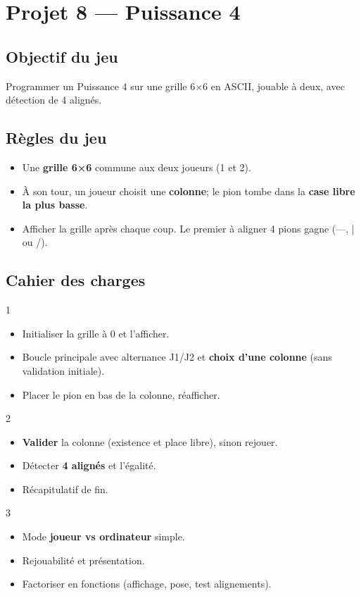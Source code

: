 \section{Projet 8 — Puissance 4}
\setcounter{UPSTInumeroCahier des charges}{0}

\subsection*{Objectif du jeu}
Programmer un Puissance 4 sur une grille 6×6 en ASCII, jouable à deux, avec détection de 4 alignés.

\subsection*{Règles du jeu}
\begin{itemize}
  \item Une \textbf{grille 6×6} commune aux deux joueurs (1 et 2).
  \item À son tour, un joueur choisit une \textbf{colonne}; le pion tombe dans la \textbf{case libre la plus basse}.
  \item Afficher la grille après chaque coup. Le premier à aligner 4 pions gagne (—, | ou /).
\end{itemize}

\subsection*{Cahier des charges}
\begin{UPSTICahierDesCharges}{1}
\begin{itemize}
  \item Initialiser la grille à 0 et l’afficher.
  \item Boucle principale avec alternance J1/J2 et \textbf{choix d’une colonne} (sans validation initiale).
  \item Placer le pion en bas de la colonne, réafficher.
\end{itemize}
\end{UPSTICahierDesCharges}

\begin{UPSTICahierDesCharges}{2}
\begin{itemize}
  \item \textbf{Valider} la colonne (existence et place libre), sinon rejouer.
  \item Détecter \textbf{4 alignés} et l’égalité.
  \item Récapitulatif de fin.
\end{itemize}
\end{UPSTICahierDesCharges}

\begin{UPSTICahierDesCharges}{3}
\begin{itemize}
  \item Mode \textbf{joueur vs ordinateur} simple.
  \item Rejouabilité et présentation.
  \item Factoriser en fonctions (affichage, pose, test alignements).
\end{itemize}
\end{UPSTICahierDesCharges}

